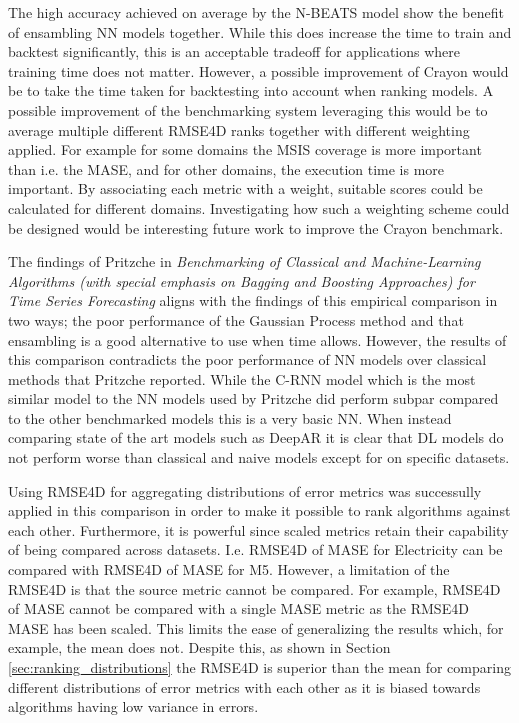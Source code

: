 The high accuracy achieved on average by the N-BEATS model show the benefit of ensambling NN models together. While this does increase the time to train and backtest significantly, this is an acceptable tradeoff for applications where training time does not matter. However, a possible improvement of Crayon would be to take the time taken for backtesting into account when ranking models. A possible improvement of the benchmarking system leveraging this would be to average multiple different RMSE4D ranks together with different weighting applied. For example for some domains the MSIS coverage is more important than i.e. the MASE, and for other domains, the execution time is more important. By associating each metric with a weight, suitable scores could be calculated for different domains. Investigating how such a weighting scheme could be designed would be interesting future work to improve the Crayon benchmark.

The findings of Pritzche in \textit{Benchmarking of Classical and Machine-Learning Algorithms (with special emphasis on Bagging and Boosting Approaches) for Time Series Forecasting} aligns with the findings of this empirical comparison in two ways; the poor performance of the Gaussian Process method and that ensambling is a good alternative to use when time allows. However, the results of this comparison contradicts the poor performance of NN models over classical methods that Pritzche reported. While the C-RNN model which is the most similar model to the NN models used by Pritzche did perform subpar compared to the other benchmarked models this is a very basic NN. When instead comparing state of the art models such as DeepAR it is clear that DL models do not perform worse than classical and naive models except for on specific datasets.

Using RMSE4D for aggregating distributions of error metrics was successully applied in this comparison in order to make it possible to rank algorithms against each other. Furthermore, it is powerful since scaled metrics retain their capability of being compared across datasets. I.e. RMSE4D of MASE for Electricity can be compared with RMSE4D of MASE for M5. However, a limitation of the RMSE4D is that the source metric cannot be compared. For example, RMSE4D of MASE cannot be compared with a single MASE metric as the RMSE4D MASE has been scaled. This limits the ease of generalizing the results which, for example, the mean does not. Despite this, as shown in Section \ref{sec:ranking_distributions} the RMSE4D is superior than the mean for comparing different distributions of error metrics with each other as it is biased towards algorithms having low variance in errors.

